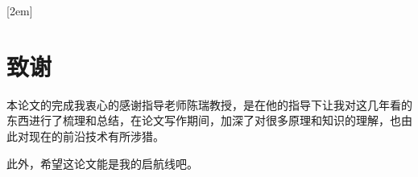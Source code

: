 
[2em]{\vspace{.5\baselineskip}\xiaosan\song}
             {\prechaptername\CJKnumber{\thecontentslabel}\postchaptername\qquad}{} 
             {}                            %

\chapter*{致\qquad 谢}

本论文的完成我衷心的感谢指导老师陈瑞教授，是在他的指导下让我对这几年看的东西进行了梳理和总结，在论文写作期间，加深了对很多原理和知识的理解，也由此对现在的前沿技术有所涉猎。

此外，希望这论文能是我的启航线吧。